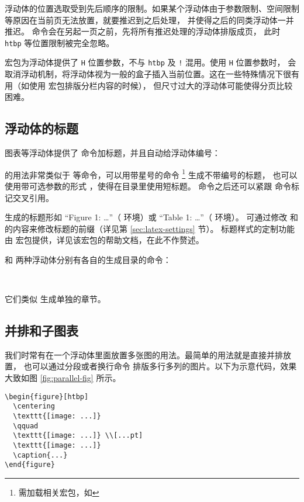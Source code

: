 浮动体的位置选取受到先后顺序的限制。如果某个浮动体由于参数限制、空间限制等原因在当前页无法放置，就要推迟到之后处理，
并使得之后的同类浮动体一并推迟。 命令会在另起一页之前，先将所有推迟处理的浮动体排版成页，
此时 \texttt{htbp} 等位置限制被完全忽略。


 宏包为浮动体提供了 \texttt{H} 位置参数，不与 \texttt{htbp} 及 \texttt{!} 混用。使用 \texttt{H} 位置参数时，
会取消浮动机制，将浮动体视为一般的盒子插入当前位置。这在一些特殊情况下很有用（如使用  宏包排版分栏内容的时候），
但尺寸过大的浮动体可能使得分页比较困难。

\subsection{浮动体的标题}\label{subsec:caption}

图表等浮动体提供了  命令加标题，并且自动给浮动体编号：
\begin{command}
\marg*{\ldots}
\end{command}
 的用法非常类似于  等命令，可以用带星号的命令 \footnote{需加载相关宏包，如 } 生成不带编号的标题，
也可以使用带可选参数的形式 \oarg*{\ldots}\marg*{\ldots}，使得在目录里使用短标题。
 命令之后还可以紧跟  命令标记交叉引用。

 生成的标题形如 ``Figure 1: \ldots''{}（ 环境）或 ``Table 1: \ldots''{}（ 环境）。
可通过修改  和  的内容来修改标题的前缀（详见第 \ref{sec:latex-settings} 节）。
标题样式的定制功能由  宏包提供，详见该宏包的帮助文档，在此不作赘述。

 和  两种浮动体分别有各自的生成目录的命令：
\begin{command}
 \\
\end{command}

它们类似  生成单独的章节。

\subsection{并排和子图表}\label{subsec:subfig}

我们时常有在一个浮动体里面放置多张图的用法。最简单的用法就是直接并排放置，
也可以通过分段或者换行命令 \crcmd{} 排版多行多列的图片。以下为示意代码，效果大致如图 \ref{fig:parallel-fig} 所示。
\begin{verbatim}
\begin{figure}[htbp]
  \centering
  \texttt{[image: ...]}
  \qquad
  \texttt{[image: ...]} \\[...pt]
  \texttt{[image: ...]}
  \caption{...}
\end{figure}
\end{verbatim}

